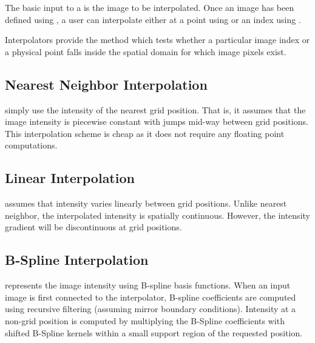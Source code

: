 
The basic input to a  is the image to
be interpolated. Once an image has been defined using ,
a user can interpolate either at a point using  or
an index using .
 
Interpolators provide the method  which tests whether a
particular image index or a physical point falls inside the spatial domain for
which image pixels exist.

\subsection{Nearest Neighbor Interpolation}
\label{sec:NearestNeighborInterpolation}
 simply use the intensity of
the nearest grid position. That is, it assumes that the image intensity
is piecewise constant with jumps mid-way between grid positions. 
This interpolation scheme is cheap as it does not require any 
floating point computations.

\subsection{Linear Interpolation}
\label{sec:LinearInterpolation}
 assumes that intensity varies linearly
between grid positions. Unlike nearest neighbor, the interpolated
intensity is spatially continuous. However, the intensity gradient
will be discontinuous at grid positions.

\subsection{B-Spline Interpolation}
\label{sec:BSplineInterpolation}
 represents the image intensity 
using B-spline basis functions. When an input image is first 
connected to the interpolator, B-spline 
coefficients are computed using recursive filtering (assuming mirror
boundary conditions). Intensity at a non-grid position is computed
by multiplying the B-Spline coefficients with shifted B-Spline kernels
within a small support region of the requested position.

